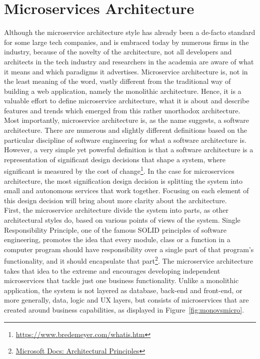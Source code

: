 \documentclass{Configuration_Files/PoliMi3i_thesis}
\begin{document}
\section{Microservices Architecture}
\label{sec:ms_arch}

Although the microservice architecture style has already been a de-facto standard for some large tech companies, and is embraced today by numerous firms in the industry, because of the novelty of the architecture, not all developers and architects in the tech industry and researchers in the academia are aware of what it means and which paradigms it advertises.
Microservice architecture is, not in the least meaning of the word, vastly different from the traditional way of building a web application, namely the monolithic architecture.
Hence, it is a valuable effort to define microservice architecture, what it is about and describe features and trends which emerged from this rather unorthodox architecture.
\\
Most importantly, microservice architecture is, as the name suggests, a software architecture.
There are numerous and slightly different definitions based on the particular discipline of software engineering for what a software architecture is.
However, a very simple yet powerful definition is that a software architecture is a representation of significant design decisions that shape a system, where significant is measured by the cost of change\footnote{\href{https://www.bredemeyer.com/whatis.htm}{https://www.bredemeyer.com/whatis.htm}}. 
In the case for microservices architecture, the most signification design decision is splitting the system into small and autonomous services that work together.
Focusing on each element of this design decision will bring about more clarity about the architecture.
\\
First, the microservice architecture divide the system into parts, as other architectural styles do, based on various points of views of the system.
Single Responsibility Principle, one of the famous SOLID principles of software engineering, promotes the idea that every module, class or a function in a computer program should have responsibility over a single part of that program's functionality, and it should encapsulate that part\footnote{\href{https://docs.microsoft.com/en-us/dotnet/architecture/modern-web-apps-azure/architectural-principles}{Microsoft Docs: Architectural Principles}}.
The microservice architecture takes that idea to the extreme and encourages developing independent microservices that tackle just one business functionality.
Unlike a monolithic application, the system is not layered as database, back-end and front-end, or more generally, data, logic and UX layers, but consists of microservices that are created around business capabilities, as displayed in Figure~\ref{fig:monovsmicro}.
\end{document}

